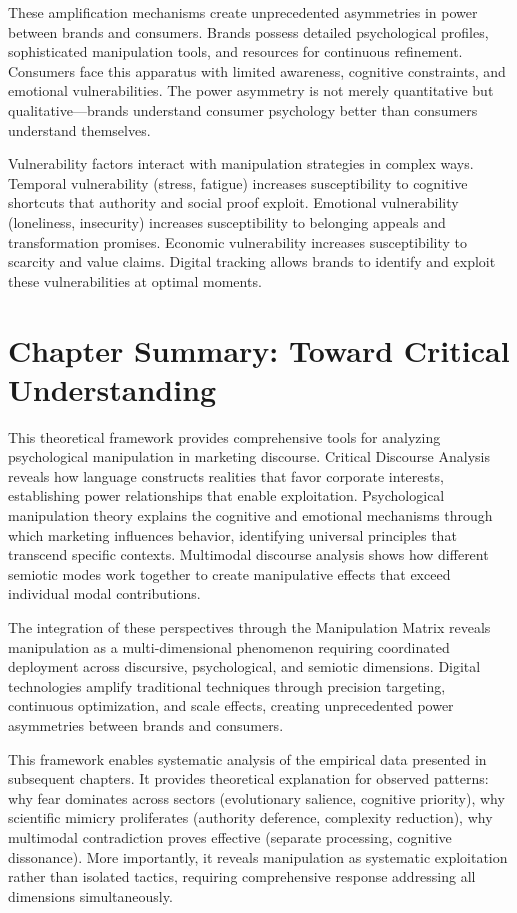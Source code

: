 These amplification mechanisms create unprecedented asymmetries in power between brands and consumers. Brands possess detailed psychological profiles, sophisticated manipulation tools, and resources for continuous refinement. Consumers face this apparatus with limited awareness, cognitive constraints, and emotional vulnerabilities. The power asymmetry is not merely quantitative but qualitative—brands understand consumer psychology better than consumers understand themselves.

Vulnerability factors interact with manipulation strategies in complex ways. Temporal vulnerability (stress, fatigue) increases susceptibility to cognitive shortcuts that authority and social proof exploit. Emotional vulnerability (loneliness, insecurity) increases susceptibility to belonging appeals and transformation promises. Economic vulnerability increases susceptibility to scarcity and value claims. Digital tracking allows brands to identify and exploit these vulnerabilities at optimal moments.

\section{Chapter Summary: Toward Critical Understanding}
\label{sec:theory_summary}

This theoretical framework provides comprehensive tools for analyzing psychological manipulation in marketing discourse. Critical Discourse Analysis reveals how language constructs realities that favor corporate interests, establishing power relationships that enable exploitation. Psychological manipulation theory explains the cognitive and emotional mechanisms through which marketing influences behavior, identifying universal principles that transcend specific contexts. Multimodal discourse analysis shows how different semiotic modes work together to create manipulative effects that exceed individual modal contributions.

The integration of these perspectives through the Manipulation Matrix reveals manipulation as a multi-dimensional phenomenon requiring coordinated deployment across discursive, psychological, and semiotic dimensions. Digital technologies amplify traditional techniques through precision targeting, continuous optimization, and scale effects, creating unprecedented power asymmetries between brands and consumers.

This framework enables systematic analysis of the empirical data presented in subsequent chapters. It provides theoretical explanation for observed patterns: why fear dominates across sectors (evolutionary salience, cognitive priority), why scientific mimicry proliferates (authority deference, complexity reduction), why multimodal contradiction proves effective (separate processing, cognitive dissonance). More importantly, it reveals manipulation as systematic exploitation rather than isolated tactics, requiring comprehensive response addressing all dimensions simultaneously.

